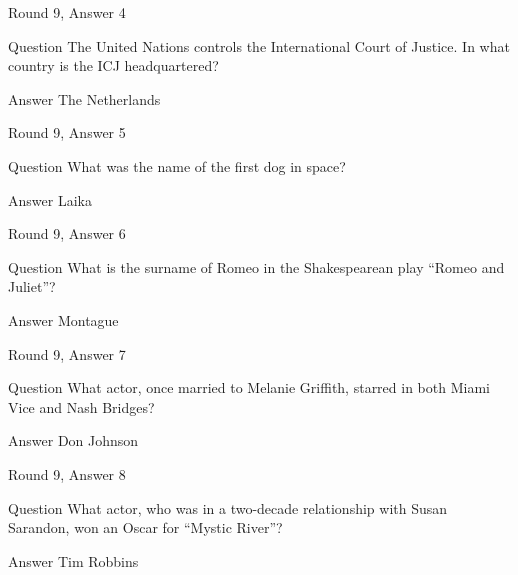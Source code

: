 \documentclass[11pt]{beamer}
\begin{document}
\begin{frame}[t]{Round 9, Answer 4}
\vspace{2em}
\begin{block}{Question}
The United Nations controls the International Court of Justice. In what country is the ICJ headquartered\@?
\end{block}
\pause{}
\begin{block}{Answer}
The Netherlands
\end{block}
\end{frame}
    

\begin{frame}[t]{Round 9, Answer 5}
\vspace{2em}
\begin{block}{Question}
What was the name of the first dog in space\@?
\end{block}
\pause{}
\begin{block}{Answer}
Laika
\end{block}
\end{frame}
    

\begin{frame}[t]{Round 9, Answer 6}
\vspace{2em}
\begin{block}{Question}
What is the surname of Romeo in the Shakespearean play ``Romeo and Juliet''\@?
\end{block}
\pause{}
\begin{block}{Answer}
Montague
\end{block}
\end{frame}
    

\begin{frame}[t]{Round 9, Answer 7}
\vspace{2em}
\begin{block}{Question}
What actor, once married to Melanie Griffith, starred in both Miami Vice and Nash Bridges\@?
\end{block}
\pause{}
\begin{block}{Answer}
Don Johnson
\end{block}
\end{frame}
    

\begin{frame}[t]{Round 9, Answer 8}
\vspace{2em}
\begin{block}{Question}
What actor, who was in a two-decade relationship with Susan Sarandon, won an Oscar for ``Mystic River''\@?
\end{block}
\pause{}
\begin{block}{Answer}
Tim Robbins
\end{block}
\end{frame}
    
\end{document}

